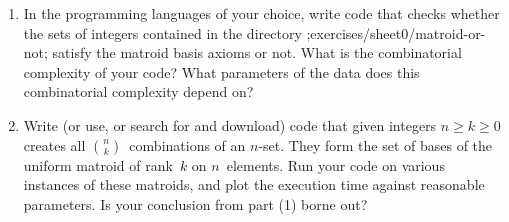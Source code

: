 \documentclass[11pt]{amsart}
\newcommand{\defn}[1]{{\color{blue}#1}}
\begin{document}
\bigskip
\begin{enumerate}
\item
  In the programming languages of your choice,
  write code that checks whether the sets of integers contained in the directory ;exercises/sheet0/matroid-or-not; satisfy the matroid basis axioms or not.
  What is the combinatorial complexity of your code?
  What parameters of the data does this combinatorial complexity depend on?

\item
  Write (or use, or search for and download) code that given integers $n\ge k\ge0$ creates all $\binom{n}{k}$~combinations of an $n$-set.
  They form the set of bases of the \defn{uniform matroid of rank~$k$ on $n$~elements}.
  Run your code on various instances of these matroids, and plot the execution time against reasonable parameters.
  Is your conclusion from part (1) borne out?
\end{enumerate}
\end{document}
